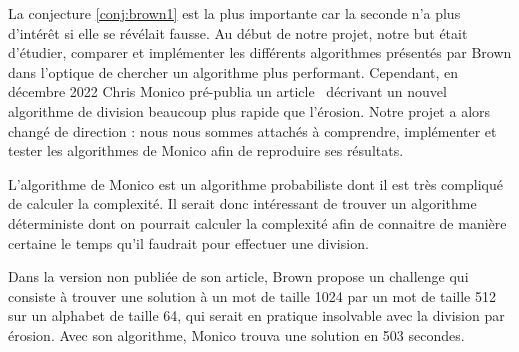 La conjecture \ref{conj:brown1} est la plus importante car la seconde n'a plus d'intérêt si elle se révélait fausse. Au début de notre projet, notre but était d'étudier, comparer et implémenter les différents algorithmes présentés par Brown dans l'optique de chercher un algorithme plus performant. Cependant, en décembre 2022 Chris Monico pré-publia un article~\cite{monico2022division} décrivant un nouvel algorithme de division beaucoup plus rapide que l'érosion. Notre projet a alors changé de direction : nous nous sommes attachés à comprendre, implémenter et tester les algorithmes de Monico afin de reproduire ses résultats.

L'algorithme de Monico est un algorithme probabiliste dont il est très compliqué de calculer la complexité. Il serait donc intéressant de trouver un algorithme déterministe dont on pourrait calculer la complexité afin de connaitre de manière certaine le temps qu'il faudrait pour effectuer une division.

Dans la version non publiée de son article, Brown propose un challenge qui consiste à trouver une solution à un mot de taille 1024 par un mot de taille 512 sur un alphabet de taille 64, qui serait en pratique insolvable avec la division par érosion. Avec son algorithme, Monico trouva une solution en 503 secondes.